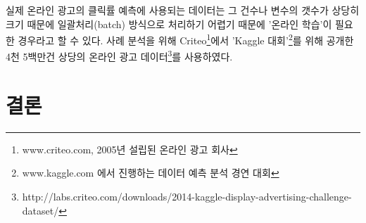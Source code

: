 \documentclass[oneside,b5paper,11pt]{book} %
\begin{document}
 실제 온라인 광고의 클릭률 예측에 사용되는 데이터는 그 건수나 변수의 갯수가 상당히 크기 때문에 일괄처리(batch) 방식으로 처리하기 어렵기 때문에 '온라인 학습'이 필요한 경우라고 할 수 있다. 사례 분석을 위해 Criteo\footnote{www.criteo.com, 2005년 설립된 온라인 광고 회사}에서 'Kaggle 대회'\footnote{www.kaggle.com 에서 진행하는 데이터 예측 분석 경연 대회}를 위해 공개한 4천 5백만건 상당의 온라인 광고 데이터\footnote{http://labs.criteo.com/downloads/2014-kaggle-display-advertising-challenge-dataset/}를 사용하였다.








%
%
\chapter{결론}














%
%


\end{document}
